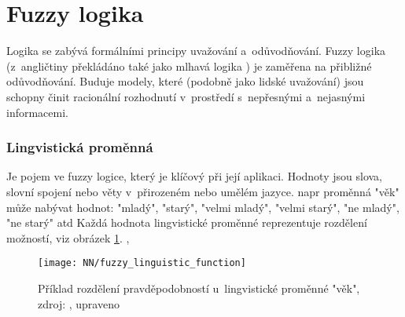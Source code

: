 \documentclass[12pt,oneside]{report}			%
\begin{document}
	\section{Fuzzy logika}
	\label{sec:fuzzy}
	Logika se zabývá formálními principy uvažování a~odůvodňování. Fuzzy logika (z~angličtiny překládáno také jako mlhavá logika \parencite{wiki_fuzzy}) je zaměřena na přibližné odůvodňování. Buduje modely, které (podobně jako lidské uvažování) jsou schopny činit racionální rozhodnutí v~prostředí s~nepřesnými a~nejasnými informacemi. \parencite[\gls{s} 83]{fuzzy_logic}
	\subsubsection{Lingvistická proměnná}
Je pojem ve fuzzy logice, který je klíčový při její aplikaci. Hodnoty jsou slova, slovní spojení nebo věty v~přirozeném nebo umělém jazyce. \Gls{napr} proměnná "věk" může nabývat hodnot: "mladý", "starý", "velmi mladý", "velmi starý", "ne mladý", "ne starý"  \gls{atd} Každá hodnota lingvistické proměnné reprezentuje rozdělení možností, \gls{viz} obrázek \ref{fig:linguistic_function}. \parencite[\gls{s} 90]{fuzzy_logic}, \parencite[\gls{str} 50]{soft_fuzzy}
\begin{figure}[h]
	\centering
	\texttt{[image: NN/fuzzy\_linguistic\_function]}
	\caption{Příklad rozdělení pravděpodobností u~lingvistické proměnné "věk", zdroj: \parencite[\gls{str} 90]{fuzzy_logic}, upraveno}
	\label{fig:linguistic_function}
	\end{figure}
\end{document}
